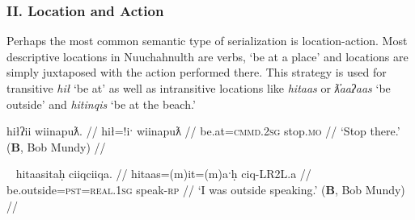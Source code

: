 \vspace{10pt}

\subsubsection{II. Location and Action}

\vspace{10pt}

Perhaps the most common semantic type of serialization is location-action. Most descriptive locations in Nuuchahnulth are verbs, `be at a place' and locations are simply juxtaposed with the action performed there. This strategy is used for transitive \textit{hił} `be at' as well as intransitive locations like \textit{hitaas} or \textit{ƛ̓aaʔaas} `be outside' and \textit{hitinqis} `be at the beach.'

\ex \label{ex:stopthere}
\begingl
\glpreamble hiłʔii wiinapuƛ. //
\gla hił=!iˑ wiinapuƛ //
\glb be.at=\textsc{cmmd.2sg} stop.\textsc{mo} //
\glft `Stop there.' (\textbf{B}, Bob Mundy) //
\endgl
\xe

\begin{comment}
\ex \label{ex:workathome}
\begingl
\glpreamble hiłitin maḥt̓iiʔakqas mamuuk. //
\gla hił=(m)it=(m)in maḥt̓ii=ʔak=qaˑs mamuuk //
\glb be.at=\textsc{pst}=\textsc{strg.1pl} house=\textsc{poss}=\textsc{defn.1sg} work.\textsc{dr} //
\glft `We worked at my house.' (\textbf{N}, Fidelia Haiyupis) //
\endgl
\xe

\ex \label{ex:screamatbeach}
\begingl
\glpreamble n̓aʔiičiʔeƛ naʔuu łuucma ʕiikʕiika hitinqis. //
\gla n̓a-°iˑčiƛ=!aƛ naʔuu łuucma ʕik-LR2L.a hitinqis //
\glb see-\textsc{in}=\textsc{now} be.with woman=\textsc{poss} scream-\textsc{rp} be.at.beach //
\glft `He heard a woman screaming on the beach.' (\textbf{C}, \textit{tupaat} Julia Lucas) //
\endgl
\xe
\end{comment}


\ex~ \label{ex:speakoutside}
\begingl
\glpreamble hitaasitaḥ ciiqciiqa. //
\gla hitaas=(m)it=(m)aˑḥ ciq-LR2L.a //
\glb be.outside=\textsc{pst}=\textsc{real.1sg} speak-\textsc{rp} //
\glft `I was outside speaking.' (\textbf{B}, Bob Mundy) //
\endgl
\xe

\begin{comment}
\ex~ \label{ex:speakoutside}
\begingl
\glpreamble qiiʔaƛintiis mamuuk ƛ̓aaʔaas. //
\gla qii=!aƛ=int=iis mamuuk ƛ̓aaʔaas //
\glb long.time=\textsc{now}=\textsc{pst}=\textsc{weak.1sg} work.\textsc{dr} be.outside //
\glft `I was working outside for a long time.' (\textbf{Q}, Sophie Billy) //
\endgl
\xe

\ex~ \label{ex:hideonroof}
\begingl
\glpreamble haptsaapaqƛiis suutił hiłaayiłkʷ. //
\gla hapt-saˑp=ʔaqƛ=iis sut-L.(č)ił hił-aˑyił=uk. //
\glb hide-\textsc{mo.caus}=\textsc{fut}=\textsc{weak.1sg} \textsc{2sg}-do.to be.at-on.a.roof=\textsc{poss} //
\glft `I will hide you on the roof.' (\textbf{Q}, Sophie Billy) //
\endgl
\xe
\end{comment}

